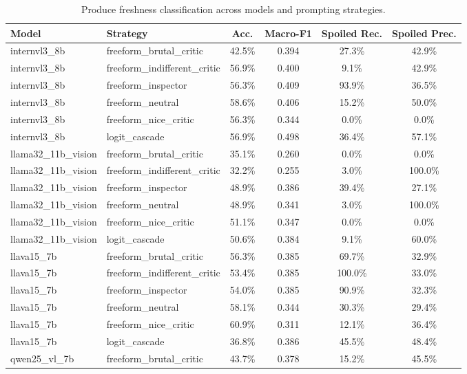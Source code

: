 \begin{table}[!htbp]
\centering
\caption{Produce freshness classification across models and prompting strategies.}
\label{tab:freshness_models}
\begin{tabular}{@{}llcccc@{}}
\toprule
\textbf{Model} & \textbf{Strategy} & \textbf{Acc.} & \textbf{Macro-F1} & \textbf{Spoiled Rec.} & \textbf{Spoiled Prec.} \\
\midrule
internvl3\_8b & freeform\_brutal\_critic & 42.5\% & 0.394 & 27.3\% & 42.9\% \\
internvl3\_8b & freeform\_indifferent\_critic & 56.9\% & 0.400 & 9.1\% & 42.9\% \\
internvl3\_8b & freeform\_inspector & 56.3\% & 0.409 & 93.9\% & 36.5\% \\
internvl3\_8b & freeform\_neutral & 58.6\% & 0.406 & 15.2\% & 50.0\% \\
internvl3\_8b & freeform\_nice\_critic & 56.3\% & 0.344 & 0.0\% & 0.0\% \\
internvl3\_8b & logit\_cascade & 56.9\% & 0.498 & 36.4\% & 57.1\% \\
llama32\_11b\_vision & freeform\_brutal\_critic & 35.1\% & 0.260 & 0.0\% & 0.0\% \\
llama32\_11b\_vision & freeform\_indifferent\_critic & 32.2\% & 0.255 & 3.0\% & 100.0\% \\
llama32\_11b\_vision & freeform\_inspector & 48.9\% & 0.386 & 39.4\% & 27.1\% \\
llama32\_11b\_vision & freeform\_neutral & 48.9\% & 0.341 & 3.0\% & 100.0\% \\
llama32\_11b\_vision & freeform\_nice\_critic & 51.1\% & 0.347 & 0.0\% & 0.0\% \\
llama32\_11b\_vision & logit\_cascade & 50.6\% & 0.384 & 9.1\% & 60.0\% \\
llava15\_7b & freeform\_brutal\_critic & 56.3\% & 0.385 & 69.7\% & 32.9\% \\
llava15\_7b & freeform\_indifferent\_critic & 53.4\% & 0.385 & 100.0\% & 33.0\% \\
llava15\_7b & freeform\_inspector & 54.0\% & 0.385 & 90.9\% & 32.3\% \\
llava15\_7b & freeform\_neutral & 58.1\% & 0.344 & 30.3\% & 29.4\% \\
llava15\_7b & freeform\_nice\_critic & 60.9\% & 0.311 & 12.1\% & 36.4\% \\
llava15\_7b & logit\_cascade & 36.8\% & 0.386 & 45.5\% & 48.4\% \\
qwen25\_vl\_7b & freeform\_brutal\_critic & 43.7\% & 0.378 & 15.2\% & 45.5\% \\

\end{tabular}
\end{table}
